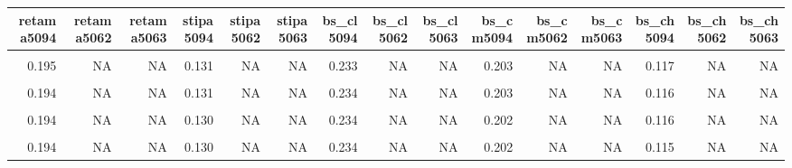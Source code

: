 \documentclass[]{article}
\begin{document}
\begin{table}[H]
\centering
\begin{tabular}[t]{r|r|r|r|r|r|r|r|r|r|r|r|r|r|r}
\hline
retama5094 & retama5062 & retama5063 & stipa5094 & stipa5062 & stipa5063 & bs\_cl5094 & bs\_cl5062 & bs\_cl5063 & bs\_cm5094 & bs\_cm5062 & bs\_cm5063 & bs\_ch5094 & bs\_ch5062 & bs\_ch5063\\
\hline
\cellcolor{gray!6}{0.197} & \cellcolor{gray!6}{NA} & \cellcolor{gray!6}{NA} & \cellcolor{gray!6}{0.132} & \cellcolor{gray!6}{NA} & \cellcolor{gray!6}{NA} & \cellcolor{gray!6}{0.232} & \cellcolor{gray!6}{NA} & \cellcolor{gray!6}{NA} & \cellcolor{gray!6}{0.205} & \cellcolor{gray!6}{NA} & \cellcolor{gray!6}{NA} & \cellcolor{gray!6}{0.121} & \cellcolor{gray!6}{NA} & \cellcolor{gray!6}{NA}\\
\hline
0.195 & NA & NA & 0.131 & NA & NA & 0.233 & NA & NA & 0.203 & NA & NA & 0.117 & NA & NA\\
\hline
\cellcolor{gray!6}{0.194} & \cellcolor{gray!6}{NA} & \cellcolor{gray!6}{NA} & \cellcolor{gray!6}{0.131} & \cellcolor{gray!6}{NA} & \cellcolor{gray!6}{NA} & \cellcolor{gray!6}{0.234} & \cellcolor{gray!6}{NA} & \cellcolor{gray!6}{NA} & \cellcolor{gray!6}{0.203} & \cellcolor{gray!6}{NA} & \cellcolor{gray!6}{NA} & \cellcolor{gray!6}{0.117} & \cellcolor{gray!6}{NA} & \cellcolor{gray!6}{NA}\\
\hline
0.194 & NA & NA & 0.131 & NA & NA & 0.234 & NA & NA & 0.203 & NA & NA & 0.116 & NA & NA\\
\hline
\cellcolor{gray!6}{0.194} & \cellcolor{gray!6}{NA} & \cellcolor{gray!6}{NA} & \cellcolor{gray!6}{0.130} & \cellcolor{gray!6}{NA} & \cellcolor{gray!6}{NA} & \cellcolor{gray!6}{0.234} & \cellcolor{gray!6}{NA} & \cellcolor{gray!6}{NA} & \cellcolor{gray!6}{0.203} & \cellcolor{gray!6}{NA} & \cellcolor{gray!6}{NA} & \cellcolor{gray!6}{0.116} & \cellcolor{gray!6}{NA} & \cellcolor{gray!6}{NA}\\
\hline
0.194 & NA & NA & 0.130 & NA & NA & 0.234 & NA & NA & 0.202 & NA & NA & 0.116 & NA & \vphantom{1} NA\\
\hline
\cellcolor{gray!6}{0.194} & \cellcolor{gray!6}{NA} & \cellcolor{gray!6}{NA} & \cellcolor{gray!6}{0.130} & \cellcolor{gray!6}{NA} & \cellcolor{gray!6}{NA} & \cellcolor{gray!6}{0.234} & \cellcolor{gray!6}{NA} & \cellcolor{gray!6}{NA} & \cellcolor{gray!6}{0.202} & \cellcolor{gray!6}{NA} & \cellcolor{gray!6}{NA} & \cellcolor{gray!6}{0.115} & \cellcolor{gray!6}{NA} & \cellcolor{gray!6}{\vphantom{2} NA}\\
\hline
0.194 & NA & NA & 0.130 & NA & NA & 0.234 & NA & NA & 0.202 & NA & NA & 0.115 & NA & \vphantom{1} NA\\

\end{tabular}
\end{table}
\end{document}
